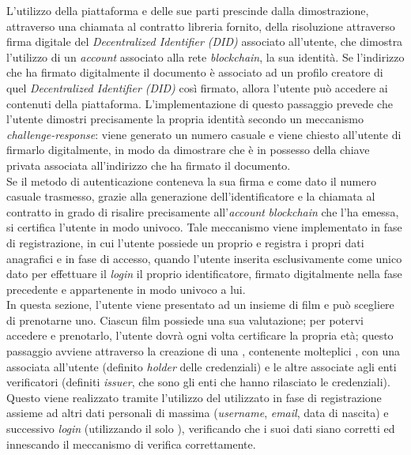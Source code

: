 L'utilizzo della piattaforma e delle sue parti prescinde dalla dimostrazione, attraverso una chiamata al contratto libreria fornito, della risoluzione attraverso firma digitale
del \textit{Decentralized Identifier (DID)} associato all'utente, che dimostra l'utilizzo di un \textit{account} associato alla rete \textit{blockchain},
la sua identità. Se l'indirizzo che ha firmato digitalmente il documento è associato ad un profilo creatore di quel \textit{Decentralized Identifier (DID)} così firmato,
allora l'utente può accedere ai contenuti della piattaforma. L'implementazione di questo passaggio prevede che l'utente dimostri precisamente
la propria identità secondo un meccanismo \textit{challenge-response}: viene generato un numero casuale e viene chiesto all'utente di firmarlo digitalmente, in modo da dimostrare
che è in possesso della chiave privata associata all'indirizzo che ha firmato il documento. \\

Se il metodo di autenticazione conteneva la sua firma e come dato il numero casuale trasmesso, grazie alla generazione dell'identificatore
e la chiamata al contratto in grado di risalire precisamente all'\textit{account} \textit{blockchain} che l'ha emessa, si certifica l'utente in modo univoco.
Tale meccanismo viene implementato in fase di registrazione, in cui l'utente possiede un proprio  e registra i propri dati anagrafici
e in fase di accesso, quando l'utente inserita esclusivamente come unico dato per effettuare il \textit{login} il proprio identificatore, firmato digitalmente nella fase precedente e appartenente in modo univoco a lui. \\

In questa sezione, l'utente viene presentato ad un insieme di film e può scegliere di prenotarne uno. Ciascun film possiede una sua valutazione;
per potervi accedere e prenotarlo, l'utente dovrà ogni volta certificare la propria età;
questo passaggio avviene attraverso la creazione di una , contenente molteplici , 
con una associata all'utente (definito \textit{holder} delle credenziali) e le altre associate agli enti verificatori (definiti \textit{issuer}, che sono gli enti che hanno rilasciato le credenziali).
Questo viene realizzato tramite l'utilizzo del  utilizzato in fase di registrazione assieme ad altri dati personali 
di massima (\textit{username}, \textit{email}, data di nascita) e successivo \textit{login} (utilizzando il solo ), verificando che 
i suoi dati siano corretti ed innescando il meccanismo di verifica correttamente. \\

